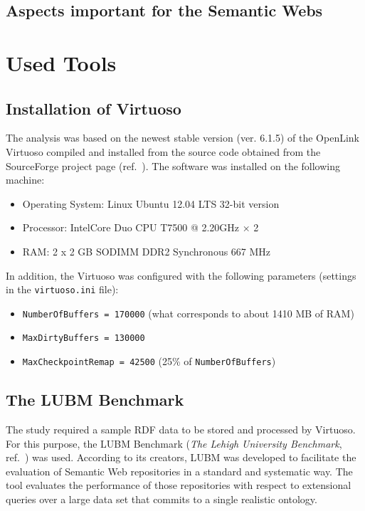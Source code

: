 \subsection{Aspects important for the Semantic Webs}


\section{Used Tools}

\subsection{Installation of Virtuoso}
The analysis was based on the newest stable version (ver. 6.1.5) of the
OpenLink Virtuoso compiled and installed from the source code obtained from the
SourceForge project page (ref.~\cite{VirtuosoUrl}). The software was installed
on the following machine:
\begin{itemize}
  \item Operating System: Linux Ubuntu 12.04 LTS 32-bit version
  \item Processor: Intel\textregistered Core Duo CPU T7500 @
  2.20GHz × 2
  \item RAM: 2 x 2 GB SODIMM DDR2 Synchronous 667 MHz 
\end{itemize}

In addition, the Virtuoso was configured with the following parameters
(settings in the \texttt{virtuoso.ini} file):

\begin{itemize}
  \item \texttt{NumberOfBuffers = 170000} (what corresponds to about 1410 MB of
  RAM)
  \item \texttt{MaxDirtyBuffers = 130000}
  \item \texttt{MaxCheckpointRemap = 42500} (25\% of \texttt{NumberOfBuffers})
\end{itemize}

\subsection{The LUBM Benchmark}
The study required a sample RDF data to be stored and processed by Virtuoso. For
this purpose, the LUBM Benchmark (\textit{The Lehigh University Benchmark},
ref.~\cite{LUBMUrl}) was used. According to its creators, LUBM was developed to
facilitate the evaluation of Semantic Web repositories in a standard and
systematic way. The tool evaluates the performance of those repositories with
respect to extensional queries over a large data set that commits to a single
realistic ontology. 

